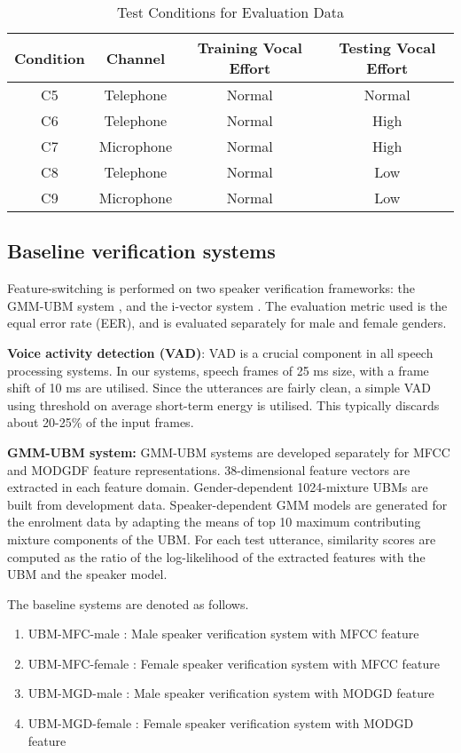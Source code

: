 \documentclass{article}
\begin{document}
\begin{table}[h!tb]
\centering
\caption{Test Conditions for Evaluation Data}
\begin{tabular}{|c|c|c|c|}
\hline
Condition & Channel & Training Vocal Effort & Testing Vocal Effort \\ 
\hline \hline
C5 & Telephone & Normal & Normal \\ \hline
C6 & Telephone & Normal & High \\ \hline
C7 & Microphone & Normal & High \\ \hline
C8 & Telephone & Normal & Low \\ \hline
C9 & Microphone & Normal & Low \\ \hline
\end{tabular}
\label{tab:datasetConditions}
\end{table}



\subsection{Baseline verification systems}
\label{subsec:baseline}

Feature-switching is performed on two speaker verification frameworks: the GMM-UBM system
\cite{reynoldsAdaptedGMM}, and the i-vector system \cite{dehak_ivector}. The evaluation
metric used is the equal error rate (EER), and is evaluated separately
for male and female genders.

\textbf{Voice activity detection (VAD)}: VAD is a crucial
 component in all speech processing systems. In our systems,
 speech frames of 25 ms size, with a frame shift of 10 ms are 
 utilised. Since the utterances are fairly clean, a simple VAD 
 using threshold on average short-term energy is utilised. This
 typically discards about 20-25\% of the input frames.

\textbf{GMM-UBM system:} GMM-UBM systems are developed separately for 
MFCC and MODGDF feature representations. 38-dimensional feature vectors are 
extracted in each feature domain. Gender-dependent 1024-mixture UBMs are built 
from development data.  Speaker-dependent GMM models are generated for the 
enrolment data by adapting the means of top 10 maximum contributing mixture 
components of the UBM. For each test utterance, similarity scores are computed 
as the ratio of the log-likelihood of the extracted features with the UBM and
the speaker model.

The baseline systems are denoted as follows.
\begin{enumerate}
\item UBM-MFC-male : Male speaker verification system with MFCC feature
\item UBM-MFC-female : Female speaker verification system with MFCC feature
\item UBM-MGD-male : Male speaker verification system with MODGD feature
\item UBM-MGD-female : Female speaker verification system with MODGD feature
\end{enumerate}
\end{document}
